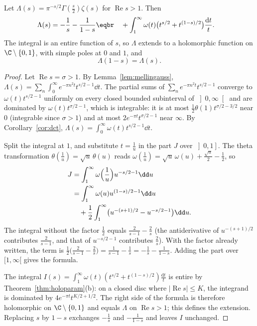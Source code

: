 \begin{theorem}[Riemann, 1859]\label{thm:functional}
Let $\Lambda(s)=\pi^{-s/2}\Gamma(\frac s2)\zeta(s)$ for $\operatorname{Re}s>1$. Then
\[
\begin{aligned}\Lambda(s)&=-\frac1s-\frac1{1-s}\eqbr\quad+\int_1^\infty\omega(t)\bigl(t^{s/2}+t^{(1-s)/2}\bigr)\frac{\mathrm dt}t.\end{aligned}
\]
The integral is an entire function of $s$, so $\Lambda$ extends to a holomorphic function on $\C\setminus\{0,1\}$, with simple poles at $0$ and $1$, and
\[
\Lambda(1-s)=\Lambda(s).
\]
\end{theorem}
\begin{proof}
Let $\operatorname{Re}s=\sigma>1$. By Lemma~\ref{lem:mellingauss}, $\Lambda(s)=\sum_n\int_0^\infty e^{-\pi n^2t}t^{s/2-1}\dd t$. The partial sums of $\sum_ne^{-\pi n^2t}t^{s/2-1}$ converge to $\omega(t)t^{s/2-1}$
uniformly on every closed bounded subinterval of $\left]0,\infty\right[$ and are dominated by $\omega(t)t^{\sigma/2-1}$, which is integrable: it is at most $\frac12\theta(1)t^{\sigma/2-3/2}$ near $0$
(integrable since $\sigma>1$) and at most $2e^{-\pi t}t^{\sigma/2-1}$ near $\infty$. By Corollary~\ref{cor:dct}, $\Lambda(s)=\int_0^\infty\omega(t)t^{s/2-1}\dd t$.

Split the integral at $1$, and substitute $t=\frac1u$ in the part $J$ over $\left]0,1\right]$. The theta transformation $\theta(\frac1u)=\sqrt u\,\theta(u)$ reads
$\omega(\frac1u)=\sqrt u\,\omega(u)+\frac{\sqrt u}2-\frac12$, so
\[
\begin{aligned}J&=\int_1^\infty\omega\Bigl(\frac1u\Bigr)u^{-s/2-1}\dd u\\&=\int_1^\infty\omega(u)u^{(1-s)/2-1}\dd u\\&\quad+\frac12\int_1^\infty\bigl(u^{-(s+1)/2}-u^{-s/2-1}\bigr)\dd u.\end{aligned}
\]
The integral without the factor $\frac12$ equals $\frac2{s-1}-\frac2s$ (the antiderivative of $u^{-(s+1)/2}$ contributes $\frac2{s-1}$, and that of $u^{-s/2-1}$ contributes $\frac2s$). With the factor already written, the term is $\frac12\bigl(\frac2{s-1}-\frac2s\bigr)=\frac1{s-1}-\frac1s=-\frac1s-\frac1{1-s}$. Adding the part over $[1,\infty[$ gives the formula.

The integral $I(s)=\int_1^\infty\omega(t)(t^{s/2}+t^{(1-s)/2})\frac{\mathrm dt}t$ is entire by Theorem~\ref{thm:holoparam}(b): on a closed disc where $|\operatorname{Re}s|\le K$, the integrand is
dominated by $4e^{-\pi t}t^{K/2+1/2}$. The right side of the formula is therefore holomorphic on $\C\setminus\{0,1\}$ and equals $\Lambda$ on $\operatorname{Re}s>1$; this defines
the extension. Replacing $s$ by $1-s$ exchanges $-\frac1s$ and $-\frac1{1-s}$ and leaves $I$ unchanged.
\end{proof}

